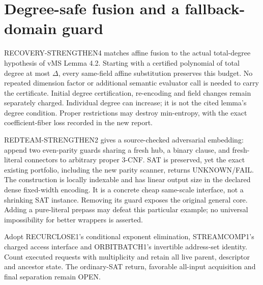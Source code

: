 \section{Degree-safe fusion and a fallback-domain guard}
RECOVERY-STRENGTHEN4 matches affine fusion to the actual total-degree
hypothesis of vMS Lemma 4.2. Starting with a certified polynomial of
total degree at most $\Delta$, every same-field affine substitution
preserves this budget. No repeated dimension factor or additional
semantic evaluator call is needed to carry the certificate. Initial
degree certification, re-encoding and field changes remain separately
charged. Individual degree can increase; it is not the cited lemma's
degree condition. Proper restrictions may destroy min-entropy, with
the exact coefficient-fiber loss recorded in the new report.

REDTEAM-STRENGTHEN2 gives a source-checked adversarial embedding:
append two even-parity guards sharing a fresh hub, a binary clause,
and fresh-literal connectors to arbitrary proper 3-CNF. SAT is
preserved, yet the exact existing portfolio, including the new parity
scanner, returns UNKNOWN/FAIL. The construction is locally indexable
and has linear output size in the declared dense fixed-width encoding.
It is a concrete cheap same-scale interface, not a shrinking SAT
instance. Removing its guard exposes the original general core.
Adding a pure-literal prepass may defeat this particular example;
no universal impossibility for better wrappers is asserted.

Adopt RECURCLOSE1's conditional exponent elimination, STREAMCOMP1's
charged access interface and ORBITBATCH1's invertible address-set
identity. Count executed requests with multiplicity and retain all
live parent, descriptor and ancestor state. The ordinary-SAT return,
favorable all-input acquisition and final separation remain OPEN.
